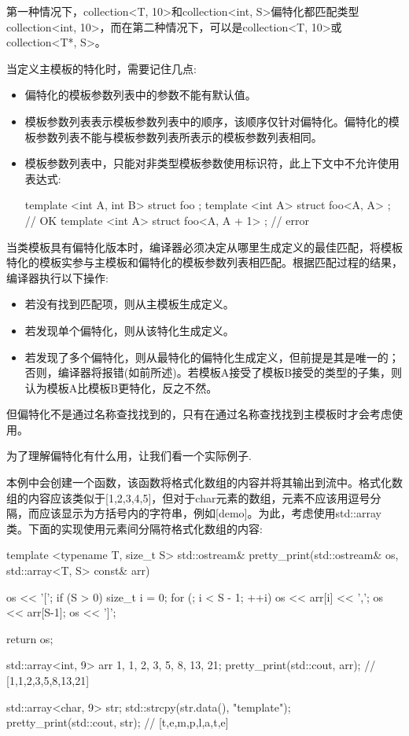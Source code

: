 第一种情况下，collection<T, 10>和collection<int, S>偏特化都匹配类型collection<int, 10>，而在第二种情况下，可以是collection<T, 10>或collection<T*, S>。

当定义主模板的特化时，需要记住几点:

\begin{itemize}
\item 
偏特化的模板参数列表中的参数不能有默认值。

\item 
模板参数列表表示模板参数列表中的顺序，该顺序仅针对偏特化。偏特化的模板参数列表不能与模板参数列表所表示的模板参数列表相同。

\item 
模板参数列表中，只能对非类型模板参数使用标识符，此上下文中不允许使用表达式:
\begin{cpp}
template <int A, int B> struct foo {};
template <int A> struct foo<A, A> {}; // OK
template <int A> struct foo<A, A + 1> {}; // error
\end{cpp}
\end{itemize}

当类模板具有偏特化版本时，编译器必须决定从哪里生成定义的最佳匹配，将模板特化的模板实参与主模板和偏特化的模板参数列表相匹配。根据匹配过程的结果，编译器执行以下操作:

\begin{itemize}
\item 
若没有找到匹配项，则从主模板生成定义。

\item 
若发现单个偏特化，则从该特化生成定义。

\item 
若发现了多个偏特化，则从最特化的偏特化生成定义，但前提是其是唯一的；否则，编译器将报错(如前所述)。若模板A接受了模板B接受的类型的子集，则认为模板A比模板B更特化，反之不然。
\end{itemize}

但偏特化不是通过名称查找找到的，只有在通过名称查找找到主模板时才会考虑使用。

为了理解偏特化有什么用，让我们看一个实际例子.

本例中会创建一个函数，该函数将格式化数组的内容并将其输出到流中。格式化数组的内容应该类似于[1,2,3,4,5]，但对于char元素的数组，元素不应该用逗号分隔，而应该显示为方括号内的字符串，例如[demo]。为此，考虑使用std::array类。下面的实现使用元素间分隔符格式化数组的内容:

\begin{cpp}
template <typename T, size_t S>
std::ostream& pretty_print(std::ostream& os,
                           std::array<T, S> const& arr)
{
	os << '[';
	if (S > 0)
	{
		size_t i = 0;
		for (; i < S - 1; ++i)
		os << arr[i] << ',';
		os << arr[S-1];
	}
	os << ']';
	
	return os;
}

std::array<int, 9> arr {1, 1, 2, 3, 5, 8, 13, 21};
pretty_print(std::cout, arr); // [1,1,2,3,5,8,13,21]

std::array<char, 9> str;
std::strcpy(str.data(), "template");
pretty_print(std::cout, str); // [t,e,m,p,l,a,t,e]
\end{cpp}

